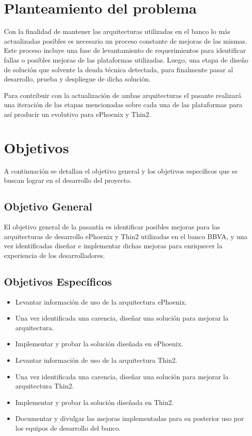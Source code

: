 \section*{Planteamiento del problema}

Con la finalidad de mantener las arquitecturas utilizadas en el banco lo
más actualizadas posibles es necesario un proceso constante de mejoras de
las mismas. Este proceso incluye una fase de levantamiento de requerimientos
para identificar fallas o posibles mejoras de las plataformas utilizadas. Luego,
una etapa de diseño de solución que solvente la deuda técnica detectada, para
finalmente pasar al desarrollo, prueba y despliegue de dicha solución.

Para contribuir con la actualización de ambas arquitecturas el pasante realizará
una iteración de las etapas mencionadas sobre cada una de las plataformas para
así producir un evolutivo para ePhoenix y Thin2.

\section*{Objetivos}
A continuación se detallan el objetivo general y los objetivos específicos que
se buscan lograr en el desarrollo del proyecto.
\subsection*{Objetivo General}
El objetivo general de la pasantía es identificar posibles mejoras para las arquitecturas
de desarrollo ePhoenix y Thin2 utilizadas en el banco BBVA, y una vez
identificadas diseñar e implementar dichas mejoras para enriquecer la experiencia
de los desarrolladores.
\subsection*{Objetivos Específicos}
\begin{itemize}
  \item Levantar información de uso de la arquitectura ePhoenix.
  \item Una vez identificada una carencia, diseñar una solución para
        mejorar la arquitectura.
  \item Implementar y probar la solución diseñada en ePhoenix.
  \item Levantar información de uso de la arquitectura Thin2.
  \item Una vez identificada una carencia, diseñar una solución para
        mejorar la arquitectura Thin2.
  \item Implementar y probar la solución diseñada en Thin2.
  \item Documentar y divulgar las mejoras implementadas para su
        posterior uso por los equipos de desarrollo del banco.
\end{itemize}

